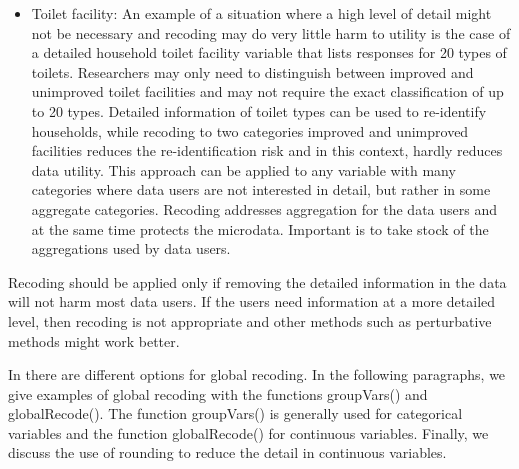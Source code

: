 \documentclass[letterpaper,10pt,english]{sphinxmanual}
\begin{document}
\begin{itemize}
\item {} 
Toilet facility: An example of a situation where a high level of
detail might not be necessary and recoding may do very little harm to
utility is the case of a detailed household toilet facility variable
that lists responses for 20 types of toilets. Researchers may only
need to distinguish between improved and unimproved toilet facilities
and may not require the exact classification of up to 20 types.
Detailed information of toilet types can be used to re-identify
households, while recoding to two categories \textendash{} improved and
unimproved facilities \textendash{} reduces the re-identification risk and in
this context, hardly reduces data utility. This approach can be
applied to any variable with many categories where data users are not
interested in detail, but rather in some aggregate categories.
Recoding addresses aggregation for the data users and at the same
time protects the microdata. Important is to take stock of the
aggregations used by data users.

\end{itemize}

Recoding should be applied only if removing the detailed information in
the data will not harm most data users. If the users need information at
a more detailed level, then recoding is not appropriate and other
methods such as perturbative methods might work better.

In  there are different options for global recoding. In the
following paragraphs, we give examples of global recoding with the
functions groupVars() and globalRecode(). The function groupVars() is
generally used for categorical variables and the function globalRecode()
for continuous variables. Finally, we discuss the use of rounding to
reduce the detail in continuous variables.
\end{document}
